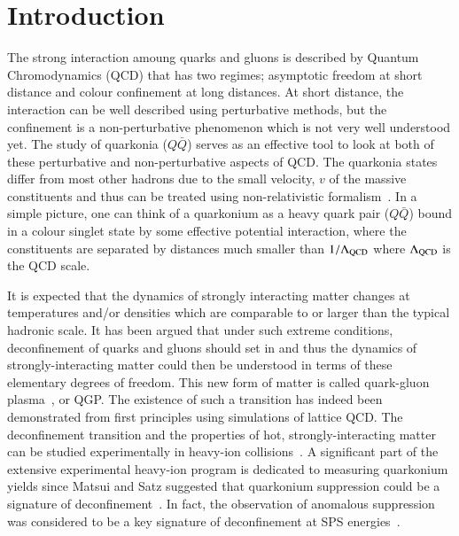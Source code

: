 \newpage
\section{Introduction}
\label{sec:Introduction}


The strong interaction amoung quarks and gluons is described by
Quantum Chromodynamics (QCD) that has two regimes; asymptotic freedom at short distance
and colour confinement at long distances.
At short distance, the interaction can be well described using perturbative methods,
but the confinement is a non-perturbative phenomenon which is not very
well understood yet. 
 The study of quarkonia ($Q\bar{Q}$) serves as an effective 
tool to look at  both of these perturbative and non-perturbative aspects of QCD.
The quarkonia states differ from most other hadrons due to the small velocity, $v$ of the massive
constituents and thus can be treated using non-relativistic formalism~\cite{Povh:1995mua,Ikhdair:2005jf}. 
In a simple picture, one can think of a quarkonium as a heavy quark pair ($Q\bar{Q}$) bound
in a colour singlet state by some effective potential interaction, where the constituents are 
separated by distances much smaller than $1/\Lambda_{\rm QCD}$ where $\Lambda_{\rm QCD}$
is the QCD scale.


It is expected that the dynamics of strongly interacting matter changes
at temperatures and/or densities which are comparable to or larger than
the typical hadronic scale.
It has been argued that under such extreme conditions, 
deconfinement of quarks and gluons should set in and thus the 
dynamics of strongly-interacting matter could then
be understood in terms of these elementary degrees of freedom.
This new form of matter is called
quark-gluon plasma~\cite{Shuryak:1980tp,Satz:2011wf}, or QGP.
The existence of such a transition has indeed been demonstrated 
from first principles using simulations of lattice QCD.
 The deconfinement transition and the properties of hot, strongly-interacting 
matter can be studied experimentally in heavy-ion collisions~\cite{Satz:2000bn}. 
A significant part of the extensive experimental heavy-ion
program is dedicated to measuring quarkonium yields since Matsui and Satz
suggested that quarkonium suppression could be a signature of 
deconfinement~\cite{Matsui:1986dk}.
In fact, the observation of anomalous suppression was considered to be
a key signature of deconfinement at SPS energies~\cite{Kluberg:2005yh}.




